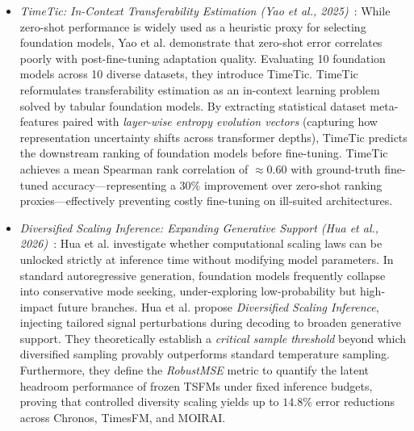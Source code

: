 \begin{itemize}[leftmargin=*]
    \item \emph{TimeTic: In-Context Transferability Estimation (Yao et al., 2025)}~\cite{yao2025timetic}: While zero-shot performance is widely used as a heuristic proxy for selecting foundation models, Yao et al. demonstrate that zero-shot error correlates poorly with post-fine-tuning adaptation quality. Evaluating 10 foundation models across 10 diverse datasets, they introduce TimeTic. TimeTic reformulates transferability estimation as an in-context learning problem solved by tabular foundation models. By extracting statistical dataset meta-features paired with \emph{layer-wise entropy evolution vectors} (capturing how representation uncertainty shifts across transformer depths), TimeTic predicts the downstream ranking of foundation models before fine-tuning. TimeTic achieves a mean Spearman rank correlation of $\approx 0.60$ with ground-truth fine-tuned accuracy—representing a $30\%$ improvement over zero-shot ranking proxies—effectively preventing costly fine-tuning on ill-suited architectures.

    \item \emph{Diversified Scaling Inference: Expanding Generative Support (Hua et al., 2026)}~\cite{hua2026diversified}: Hua et al. investigate whether computational scaling laws can be unlocked strictly at inference time without modifying model parameters. In standard autoregressive generation, foundation models frequently collapse into conservative mode seeking, under-exploring low-probability but high-impact future branches. Hua et al. propose \emph{Diversified Scaling Inference}, injecting tailored signal perturbations during decoding to broaden generative support. They theoretically establish a \emph{critical sample threshold} beyond which diversified sampling provably outperforms standard temperature sampling. Furthermore, they define the \emph{RobustMSE} metric to quantify the latent headroom performance of frozen TSFMs under fixed inference budgets, proving that controlled diversity scaling yields up to $14.8\%$ error reductions across Chronos, TimesFM, and MOIRAI.


\end{itemize}
